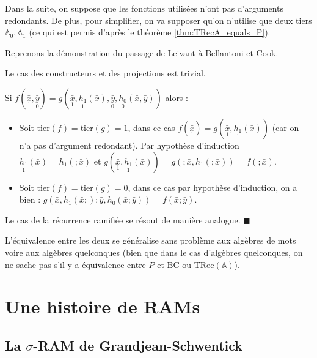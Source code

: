\documentclass{report}
\newcommand{\bbA}{\mathbb{A}}
\newcommand{\TRec}[1]{\text{TRec}\left(\mathbb{#1}\right)}
\begin{document}
\begin{demo}
			Dans la suite, on suppose que les fonctions utilisées n'ont pas d'arguments redondants. De plus, pour simplifier, on va supposer qu'on n'utilise que deux tiers $\bbA_0, \bbA_1$ (ce qui est permis d'après le théorème \ref{thm:TRecA_equals_P}).
			
			Reprenons la démonstration du passage de Leivant à Bellantoni et Cook.
			
			Le cas des constructeurs et des projections est trivial.
			
			Si $f(\underset{1}{\bar{x}}, \underset{0}{\bar{y}}) = g( \underset{1}{\bar{x}}, \underset{1}{h_1}(\bar{x}), \underset{0}{\bar{y}}, \underset{0}{h_0}(\bar{x}, \bar{y}))$ alors :
			
			\begin{itemize}[itemsep=-1mm]
				\item 	Soit $\text{tier}(f) = \text{tier}(g) = 1$, dans ce cas $f(\underset{1}{\bar{x}}) = g( \underset{1}{\bar{x}}, \underset{1}{h_1}(\bar{x}))$ (car on n'a pas d'argument redondant). Par hypothèse d'induction $\underset{1}{h_1}(\bar{x}) = h_1(;\bar{x})$ et $g(\underset{1}{\bar{x}}, \underset{1}{h_1}(\bar{x})) = g(; \bar{x}, h_1(;\bar{x})) = f(; \bar{x})$.
				
				\item 	Soit $\text{tier}(f) = \text{tier}(g) = 0$, dans ce cas par hypothèse d'induction, on a bien : $g( \bar{x}, h_1(\bar{x};) ; \bar{y}, h_0(\bar{x}; \bar{y})) = f(\bar{x} ; \bar{y})$.
			\end{itemize}
			
			Le cas de la récurrence ramifiée se résout de manière analogue. $\blacksquare$
		\end{demo}
		

		L'équivalence entre les deux se généralise sans problème aux algèbres de mots voire aux algèbres quelconques (bien que dans le cas d'algèbres quelconques, on ne sache pas s'il y a équivalence entre $P$ et $\text{BC}$ ou $\TRec{A}$).
		
		



	\pagebreak
	
	\section{Une histoire de RAMs}
	\label{sec:RAM_story}

	
		\subsection{La $\sigma$-RAM de Grandjean-Schwentick}
		\label{subsec:sigma_RAM}
		
\end{document}
